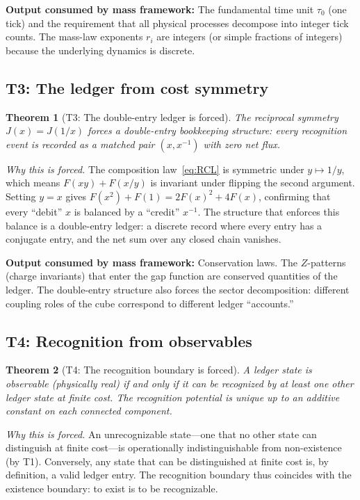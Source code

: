 \documentclass[11pt,a4paper]{article}
\newtheorem{theorem}{Theorem}[section]
\theoremstyle{definition}
\theoremstyle{remark}
\newcommand{\Jcost}{J}
\begin{document}
\medskip
\noindent\textbf{Output consumed by mass framework:}
The fundamental time unit $\tau_0$ (one tick) and the requirement that all
physical processes decompose into integer tick counts.  The mass-law exponents
$r_i$ are integers (or simple fractions of integers) because the underlying
dynamics is discrete.

\subsection{T3: The ledger from cost symmetry}

\begin{theorem}[T3: The double-entry ledger is forced]
\label{thm:T3}
The reciprocal symmetry $\Jcost(x) = \Jcost(1/x)$ forces a double-entry
bookkeeping structure: every recognition event is recorded as a matched pair
$(x, x^{-1})$ with zero net flux.
\end{theorem}

\noindent\textit{Why this is forced.}\quad
The composition law~\eqref{eq:RCL} is symmetric under $y \mapsto 1/y$, which
means $F(xy) + F(x/y)$ is invariant under flipping the second argument.
Setting $y = x$ gives $F(x^2) + F(1) = 2F(x)^2 + 4F(x)$, confirming that
every ``debit'' $x$ is balanced by a ``credit'' $x^{-1}$.  The structure
that enforces this balance is a double-entry ledger: a discrete record where
every entry has a conjugate entry, and the net sum over any closed chain
vanishes.

\medskip
\noindent\textbf{Output consumed by mass framework:}
Conservation laws.  The $Z$-patterns (charge invariants) that enter the gap
function are conserved quantities of the ledger.  The double-entry structure
also forces the sector decomposition: different coupling roles of the cube
correspond to different ledger ``accounts.''

\subsection{T4: Recognition from observables}

\begin{theorem}[T4: The recognition boundary is forced]
\label{thm:T4}
A ledger state is observable (physically real) if and only if it can be
recognized by at least one other ledger state at finite cost.
The recognition potential is unique up to an additive constant on each
connected component.
\end{theorem}

\noindent\textit{Why this is forced.}\quad
An unrecognizable state---one that no other state can distinguish at finite
cost---is operationally indistinguishable from non-existence (by T1).
Conversely, any state that can be distinguished at finite cost is, by
definition, a valid ledger entry.  The recognition boundary thus coincides
with the existence boundary: to exist is to be recognizable.
\end{document}
